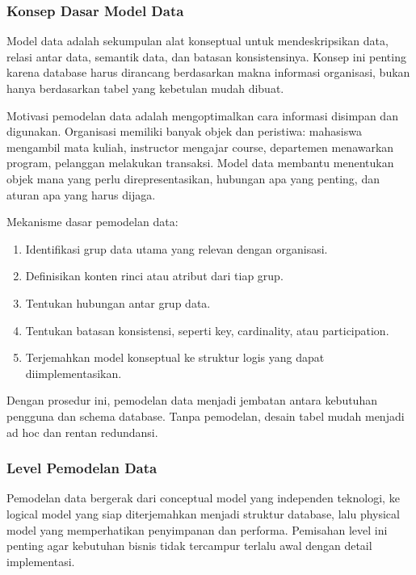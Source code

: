 \subsubsection{Konsep Dasar Model Data}

\begin{jawab}
Model data adalah sekumpulan alat konseptual untuk mendeskripsikan data, relasi antar data, semantik data, dan batasan konsistensinya. Konsep ini penting karena database harus dirancang berdasarkan makna informasi organisasi, bukan hanya berdasarkan tabel yang kebetulan mudah dibuat.
\end{jawab}

Motivasi pemodelan data adalah mengoptimalkan cara informasi disimpan dan digunakan. Organisasi memiliki banyak objek dan peristiwa: mahasiswa mengambil mata kuliah, instructor mengajar course, departemen menawarkan program, pelanggan melakukan transaksi. Model data membantu menentukan objek mana yang perlu direpresentasikan, hubungan apa yang penting, dan aturan apa yang harus dijaga.

Mekanisme dasar pemodelan data:
\begin{enumerate}
    \item Identifikasi grup data utama yang relevan dengan organisasi.
    \item Definisikan konten rinci atau atribut dari tiap grup.
    \item Tentukan hubungan antar grup data.
    \item Tentukan batasan konsistensi, seperti key, cardinality, atau participation.
    \item Terjemahkan model konseptual ke struktur logis yang dapat diimplementasikan.
\end{enumerate}

Dengan prosedur ini, pemodelan data menjadi jembatan antara kebutuhan pengguna dan schema database. Tanpa pemodelan, desain tabel mudah menjadi ad hoc dan rentan redundansi.

\subsubsection{Level Pemodelan Data}

\begin{jawab}
Pemodelan data bergerak dari conceptual model yang independen teknologi, ke logical model yang siap diterjemahkan menjadi struktur database, lalu physical model yang memperhatikan penyimpanan dan performa. Pemisahan level ini penting agar kebutuhan bisnis tidak tercampur terlalu awal dengan detail implementasi.
\end{jawab}

